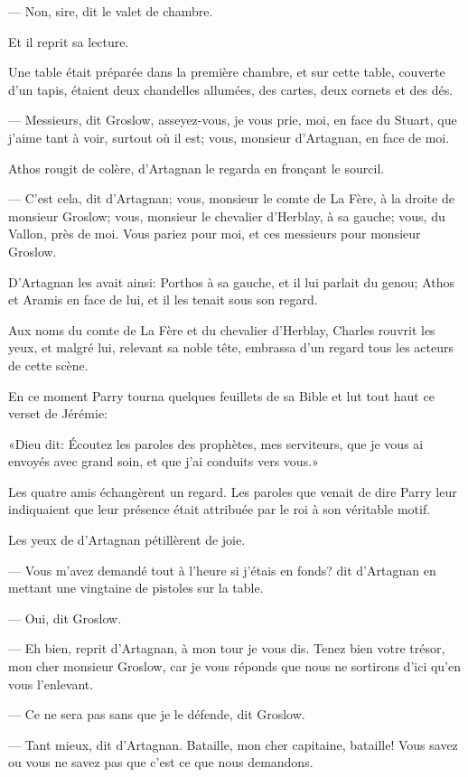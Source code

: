 — Non, sire, dit le valet de chambre.

Et il reprit sa lecture.

Une table était préparée dans la première chambre, et sur cette table, couverte d'un tapis, étaient deux chandelles allumées, des cartes, deux cornets et des dés.

— Messieurs, dit Groslow, asseyez-vous, je vous prie, moi, en face du Stuart, que j'aime tant à voir, surtout où il est; vous, monsieur d'Artagnan, en face de moi.

Athos rougit de colère, d'Artagnan le regarda en fronçant le sourcil.

— C'est cela, dit d'Artagnan; vous, monsieur le comte de La Fère, à la droite de monsieur Groslow; vous, monsieur le chevalier d'Herblay, à sa gauche; vous, du Vallon, près de moi. Vous pariez pour moi, et ces messieurs pour monsieur Groslow.

D'Artagnan les avait ainsi: Porthos à sa gauche, et il lui parlait du genou; Athos et Aramis en face de lui, et il les tenait sous son regard.

Aux noms du comte de La Fère et du chevalier d'Herblay, Charles rouvrit les yeux, et malgré lui, relevant sa noble tête, embrassa d'un regard tous les acteurs de cette scène.

En ce moment Parry tourna quelques feuillets de sa Bible et lut tout haut ce verset de Jérémie:

«Dieu dit: Écoutez les paroles des prophètes, mes serviteurs, que je vous ai envoyés avec grand soin, et que j'ai conduits vers vous.»

Les quatre amis échangèrent un regard. Les paroles que venait de dire Parry leur indiquaient que leur présence était attribuée par le roi à son véritable motif.

Les yeux de d'Artagnan pétillèrent de joie.

— Vous m'avez demandé tout à l'heure si j'étais en fonds? dit d'Artagnan en mettant une vingtaine de pistoles sur la table.

— Oui, dit Groslow.

— Eh bien, reprit d'Artagnan, à mon tour je vous dis. Tenez bien votre trésor, mon cher monsieur Groslow, car je vous réponds que nous ne sortirons d'ici qu'en vous l'enlevant.

— Ce ne sera pas sans que je le défende, dit Groslow.

— Tant mieux, dit d'Artagnan. Bataille, mon cher capitaine, bataille! Vous savez ou vous ne savez pas que c'est ce que nous demandons.

